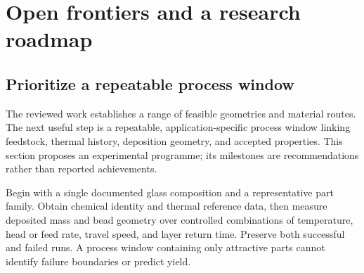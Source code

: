 \section{Open frontiers and a research roadmap}
\label{sec:roadmap}
\subsection{Prioritize a repeatable process window}
The reviewed work establishes a range of feasible geometries and material routes. The next useful step is a repeatable, application-specific process window linking feedstock, thermal history, deposition geometry, and accepted properties. This section proposes an experimental programme; its milestones are recommendations rather than reported achievements.

Begin with a single documented glass composition and a representative part family. Obtain chemical identity and thermal reference data, then measure deposited mass and bead geometry over controlled combinations of temperature, head or feed rate, travel speed, and layer return time. Preserve both successful and failed runs. A process window containing only attractive parts cannot identify failure boundaries or predict yield.

